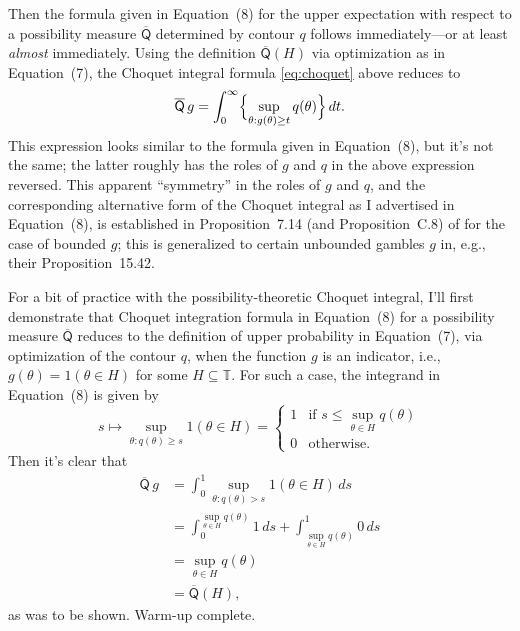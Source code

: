 \documentclass[a4paper, 12pt]{article}
\theoremstyle{plain}
\theoremstyle{definition}
\theoremstyle{remark}
\newcommand{\TT}{\mathbb{T}}
\newcommand{\uprior}{\overline{\mathsf{Q}}}
\begin{document}
Then the formula given in Equation~(8) for the upper expectation with respect to a possibility measure $\uprior$ determined by contour $q$ follows immediately---or at least {\em almost} immediately.  Using the definition $\uprior(H)$ via optimization as in Equation~(7), the Choquet integral formula \eqref{eq:choquet} above reduces to
\[ \uprior\,g = \int_0^\infty \Bigl\{ \sup_{\theta: g(\theta) \geq t} q(\theta) \Bigr\} \, dt. \]
This expression looks similar to the formula given in Equation~(8), but it's not the same; the latter roughly has the roles of $g$ and $q$ in the above expression reversed.  This apparent ``symmetry'' in the roles of $g$ and $q$, and the corresponding alternative form of the Choquet integral as I advertised in Equation~(8), is established in Proposition~7.14 (and Proposition~C.8) of \citet{lower.previsions.book} for the case of bounded $g$; this is generalized to certain unbounded gambles $g$ in, e.g., their Proposition~15.42. 

For a bit of practice with the possibility-theoretic Choquet integral, I'll first demonstrate that Choquet integration formula in Equation~(8) for a possibility measure $\uprior$ reduces to the definition of upper probability in Equation~(7), via optimization of the contour $q$, when the function $g$ is an indicator, i.e., $g(\theta) = 1(\theta \in H)$ for some $H \subseteq \TT$.  For such a case, the integrand in Equation~(8) is given by 
\[ s \mapsto \sup_{\theta: q(\theta) \geq s} 1(\theta \in H) = \begin{cases} 1 & \text{if $s \leq \sup_{\theta \in H} q(\theta)$} \\ 0 & \text{otherwise}. \end{cases} \]
Then it's clear that 
\begin{align*}
\uprior\,g & = \int_0^1 \sup_{\theta: q(\theta) > s} 1(\theta \in H) \, ds \\
& = \int_0^{\sup_{\theta \in H} q(\theta)} 1 \, ds + \int_{\sup_{\theta \in H} q(\theta)}^1 0 \, ds \\
& = \sup_{\theta \in H} q(\theta) \\
& = \uprior(H), 
\end{align*}
as was to be shown.  Warm-up complete. 
\end{document}
